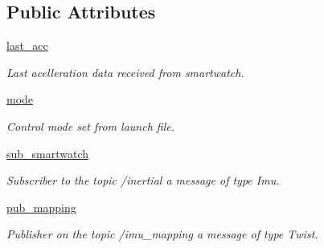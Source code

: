 \subsection*{Public Attributes}
\begin{DoxyCompactItemize}
\item 
\mbox{\label{classimu__data__map_1_1Smartwatch__data_af22e8905ef324d843378a1e21a6dbfd7}} 
\mbox{\hyperlink{classimu__data__map_1_1Smartwatch__data_af22e8905ef324d843378a1e21a6dbfd7}{last\+\_\+acc}}
\begin{DoxyCompactList}\small\item\em Last acelleration data received from smartwatch. \end{DoxyCompactList}\item 
\mbox{\label{classimu__data__map_1_1Smartwatch__data_a51d2bf263e711d2f46d0f3938876ab1b}} 
\mbox{\hyperlink{classimu__data__map_1_1Smartwatch__data_a51d2bf263e711d2f46d0f3938876ab1b}{mode}}
\begin{DoxyCompactList}\small\item\em Control mode set from launch file. \end{DoxyCompactList}\item 
\mbox{\label{classimu__data__map_1_1Smartwatch__data_afcc4c7dcd28ae253c4ba6d2f8b764a78}} 
\mbox{\hyperlink{classimu__data__map_1_1Smartwatch__data_afcc4c7dcd28ae253c4ba6d2f8b764a78}{sub\+\_\+smartwatch}}
\begin{DoxyCompactList}\small\item\em Subscriber to the topic /inertial a message of type Imu. \end{DoxyCompactList}\item 
\mbox{\label{classimu__data__map_1_1Smartwatch__data_a3241696498b139d0a102f1906dfad4d7}} 
\mbox{\hyperlink{classimu__data__map_1_1Smartwatch__data_a3241696498b139d0a102f1906dfad4d7}{pub\+\_\+mapping}}
\begin{DoxyCompactList}\small\item\em Publisher on the topic /imu\+\_\+mapping a message of type Twist. \end{DoxyCompactList}\end{DoxyCompactItemize}


